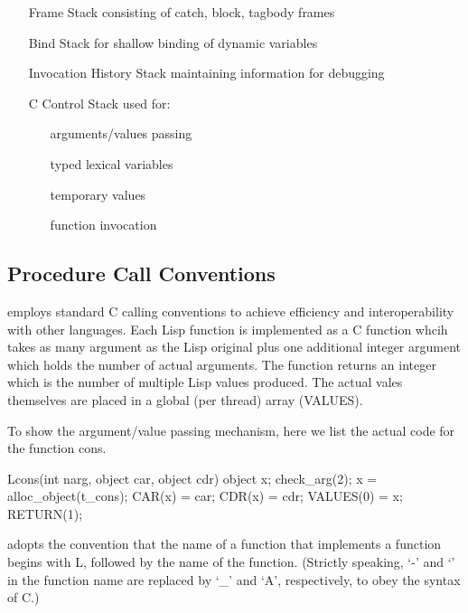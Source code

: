 \begin{itemize}
\item[Frame Stack] consisting of catch, block, tagbody frames

\item[Bind Stack] for shallow binding of dynamic variables

\item[Invocation History Stack] maintaining information for debugging

\item[C Control Stack] used for:
\begin{itemize}
\item[] arguments/values passing
\item[] typed lexical variables
\item[] temporary values
\item[] function invocation
\end{itemize}
\end{itemize}

\subsection{Procedure Call Conventions}
 
\ecl{} employs standard C calling conventions to achieve efficiency and
interoperability with other languages.
Each Lisp function is implemented as a C function whcih takes as many
argument as the Lisp original plus one additional integer argument
which holds the number of actual arguments.  The function returns an
integer which is the number of multiple Lisp values produced. The actual vales
themselves are placed in a global (per thread) array ({\code VALUES}).

To show the argument/value passing mechanism, here we list the actual
code for the \clisp{} function {\code cons}.

\begin{example}
   Lcons(int narg, object car, object cdr)
   {       object x;
           check_arg(2);
           x = alloc_object(t_cons);
           CAR(x) = car;
           CDR(x) = cdr;
           VALUES(0) = x;
           RETURN(1);
   }
\end{example}

\ecl{} adopts the convention that the name of a function that
implements a \clisp{} function begins with {\code L}, followed by the
name of the \clisp{} function.  (Strictly speaking, `{\code -}' and
`{\code *}' in the \clisp{} function name are replaced by `{\code \_}' and
`{\code A}', respectively, to obey the syntax of C.)

